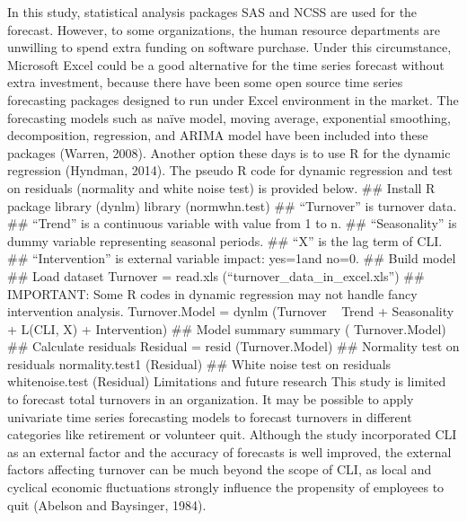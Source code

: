 In this study, statistical analysis packages SAS and NCSS are used for the forecast. However, to some organizations, the human resource departments are unwilling to spend extra funding on software purchase. Under this circumstance, Microsoft Excel could be a good alternative for the time series forecast without extra investment, because there have been some open source time series forecasting packages designed to run under Excel environment in the market. The forecasting models such as naïve model, moving average, exponential smoothing, decomposition, regression, and ARIMA model have been included into these packages (Warren, 2008).
Another option these days is to use R for the dynamic regression (Hyndman, 2014). The pseudo R code for dynamic regression and test on residuals (normality and white noise test) is provided below. 
## Install R package
library (dynlm)
library (normwhn.test)
## “Turnover” is turnover data.  
## “Trend” is a continuous variable with value from 1 to n. 
## “Seasonality” is dummy variable representing seasonal periods. 
## “X” is the lag term of CLI.
## “Intervention” is external variable impact: yes=1and no=0.
## Build model ## Load dataset
Turnover = read.xls (“turnover_data_in_excel.xls”)
## IMPORTANT: Some R codes in dynamic regression may not handle fancy intervention analysis.
Turnover.Model = dynlm (Turnover ~ Trend + Seasonality + L(CLI, X) + Intervention) 
## Model summary
summary ( Turnover.Model)
## Calculate residuals
Residual = resid (Turnover.Model)
## Normality test on residuals
normality.test1 (Residual)
## White noise test on residuals
whitenoise.test (Residual)
Limitations and future research
This study is limited to forecast total turnovers in an organization. It may be possible to apply univariate time series forecasting models to forecast turnovers in different categories like retirement or volunteer quit. Although the study incorporated CLI as an external factor and the accuracy of forecasts is well improved, the external factors affecting turnover can be much beyond the scope of CLI, as local and cyclical economic fluctuations strongly influence the propensity of employees to quit (Abelson and Baysinger, 1984).


